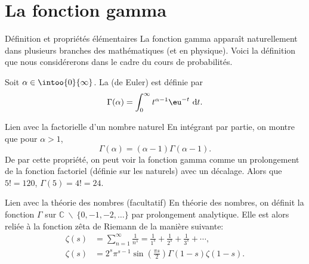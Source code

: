 \documentclass[nuit,charter,pied]{BeamerJS}
\begin{document}
\section{La fonction gamma}
\begin{frame}{Définition et propriétés élémentaires}
La fonction gamma apparaît naturellement dans plusieurs branches des mathématiques (et en physique). Voici la définition que nous considérerons dans le cadre du cours de probabilités.

\begin{defn}{}
	Soit $\alpha\in\intoo{0}{\infty}$. La  (de Euler) est définie par
	\[\Gamma(\alpha)=\int_{0}^{\infty}t^{\alpha -1}\eu^{-t}\,\dl{t}.\]
\end{defn}
\end{frame}
\begin{frame}{Lien avec la factorielle d'un nombre naturel}
En intégrant par partie, on montre que pour $\alpha>1$,
\[\Gamma(\alpha)=(\alpha-1)\Gamma(\alpha-1).\]
De par cette propriété, on peut voir la fonction gamma comme un prolongement de la fonction factoriel (définie sur les naturels) avec un décalage. Alors que $5!=120$, $\Gamma(5)=4!=24$.
\end{frame}
\begin{frame}{Lien avec la théorie des nombres (facultatif)}
En théorie des nombres, on définit la fonction $\Gamma$ sur $\mathbb{C}~\backslash~\{0,-1,-2,\ldots\}$ par prolongement analytique. Elle est alors reliée à la fonction zêta de Riemann de la manière suivante:
\begin{align*}
\zeta(s) &=\sum_{n=1}^\infty \frac{1}{n^s} =\frac{1}{1^s} + \frac{1}{2^s} + \frac{1}{3^s} + \cdots,\\
\zeta(s) &= 2^s\pi^{s-1} \sin\left(\frac{\pi s}{2}\right) \Gamma(1-s)\zeta(1-s).
\end{align*}
\end{frame}
\end{document}
